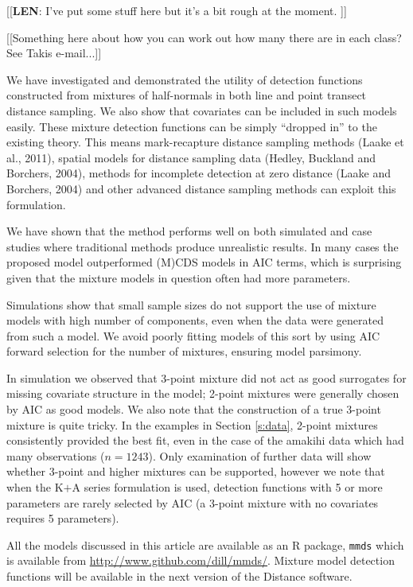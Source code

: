 \documentclass[useAMS,referee]{biom}
\begin{document}
[[\textbf{LEN}: I've put some stuff here but it's a bit rough at the moment. ]]

[[Something here about how you can work out how many there are in each class? See Takis e-mail...]]


We have investigated and demonstrated the utility of detection functions constructed from mixtures of half-normals in both line and point transect distance sampling. We also show that covariates can be included in such models easily. These mixture detection functions can be simply ``dropped in'' to the existing theory. This means mark-recapture distance sampling methods (Laake et al., 2011), spatial models for distance sampling data (Hedley, Buckland and Borchers, 2004), methods for incomplete detection at zero distance (Laake and Borchers, 2004) and other advanced distance sampling methods can exploit this formulation.

We have shown that the method performs well on both simulated and case studies where traditional methods produce unrealistic results. In many cases the proposed model outperformed (M)CDS models in AIC terms, which is surprising given that the mixture models in question often had more parameters. 

Simulations show that small sample sizes do not support the use of mixture models with high number of components, even when the data were generated from such a model. We avoid poorly fitting models of this sort by using AIC forward selection for the number of mixtures, ensuring model parsimony.

In simulation we observed that 3-point mixture did not act as good surrogates for missing covariate structure in the model; 2-point mixtures were generally chosen by AIC as good models. We also note that the construction of a true 3-point mixture is quite tricky. In the examples in Section \ref{s:data}, 2-point mixtures consistently provided the best fit, even in the case of the amakihi data which had many observations ($n=1243$). Only examination of further data will show whether 3-point and higher mixtures can be supported, however we note that when the K$+$A series formulation is used, detection functions with 5 or more parameters are rarely selected by AIC (a 3-point mixture with no covariates requires 5 parameters).

All the models discussed in this article are available as an \textsf{R} package, \texttt{mmds} which is available from \url{http://www.github.com/dill/mmds/}. Mixture model detection functions will be available in the next version of the Distance software.
\end{document}
